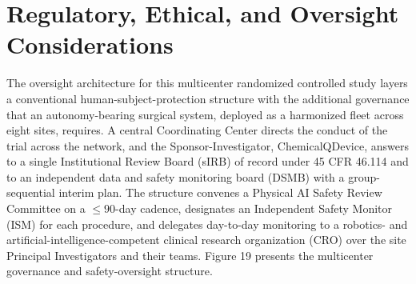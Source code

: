 \section{Regulatory, Ethical, and Oversight Considerations}

The oversight architecture for this multicenter randomized controlled study layers
a conventional human-subject-protection structure with the additional governance
that an autonomy-bearing surgical system, deployed as a harmonized fleet across
eight sites, requires. A central Coordinating Center directs the conduct of the
trial across the network, and the Sponsor-Investigator, ChemicalQDevice, answers to
a single Institutional Review Board (sIRB) of record under 45 CFR 46.114
\cite{commonrule_sirb} and to an independent data and safety monitoring board
(DSMB) with a group-sequential interim plan. The structure convenes a Physical AI
Safety Review Committee on a $\leq 90$-day cadence, designates an Independent Safety
Monitor (ISM) for each procedure, and delegates day-to-day monitoring to a
robotics- and artificial-intelligence-competent clinical research organization
(CRO) over the site Principal Investigators and their teams. Figure 19 presents the
multicenter governance and safety-oversight structure.

